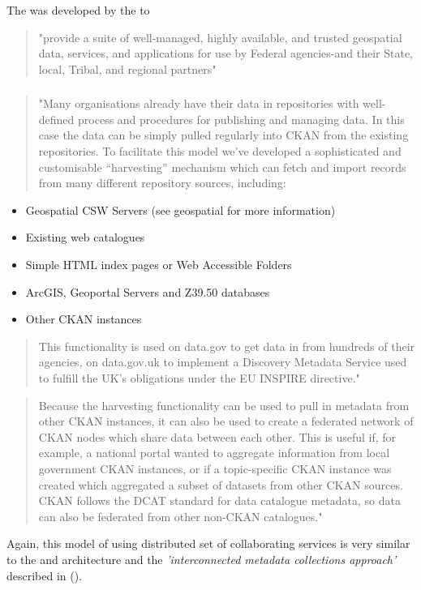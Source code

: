 \documentclass{article}
\begin{document}
The  was developed by the  to
\begin{quote}
"provide a suite of well-managed, highly available, and trusted geospatial 
data, services, and applications for use by Federal agencies-and their State,
local, Tribal, and regional partners"
\end{quote}



\subsubsection{}

\begin{quote}
"Many organisations already have their data in repositories with well-defined process and procedures
for publishing and managing data. In this case the data can be simply pulled regularly into CKAN
from the existing repositories. To facilitate this model we’ve developed a sophisticated and
customisable “harvesting” mechanism which can fetch and import records from many different
repository sources, including:
\end{quote}

\begin{itemize}
\item Geospatial CSW Servers (see geospatial for more information)
\item Existing web catalogues
\item Simple HTML index pages or Web Accessible Folders
\item ArcGIS, Geoportal Servers and Z39.50 databases
\item Other CKAN instances
\end{itemize}

\begin{quote}
This functionality is used on data.gov to get data in from hundreds of their agencies,
on data.gov.uk to implement a Discovery Metadata Service used to fulfill the UK’s
obligations under the EU INSPIRE directive."
\end{quote}

\begin{quote}
Because the harvesting functionality can be used to pull in metadata from other CKAN instances,
it can also be used to create a federated network of CKAN nodes which share data between each other.
This is useful if, for example, a national portal wanted to aggregate information from local
government CKAN instances, or if a topic-specific CKAN instance was created which aggregated
a subset of datasets from other CKAN sources. CKAN follows the DCAT standard for data catalogue
metadata, so data can also be federated from other non-CKAN catalogues." 
\end{quote}

Again, this model of using distributed set of collaborating services is very similar to the
\cite{ivoa} and \cite{astro} architecture and the \textit{'interconnected metadata collections approach'}
described in  (\cite{jones-2006}).





%
%

\printbibliography
\end{document}
